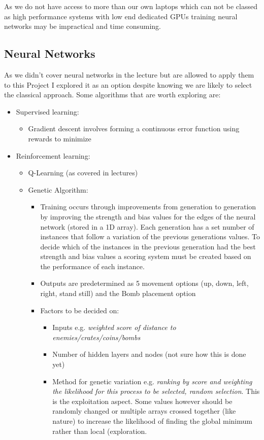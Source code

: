\documentclass[12pt]{report}
\begin{document}
As we do not have access to more than our own laptops which can not be classed as high performance systems with low end dedicated GPUs training neural networks may be impractical and time consuming.

\subsection{Neural Networks}
As we didn't cover neural networks in the lecture but are allowed to apply them to this Project I explored it as an option despite knowing we are likely to select the classical approach.
Some algorithms that are worth exploring are:
	\begin{itemize}
		\item Supervised learning:
		\begin{itemize}
			\item Gradient descent involves forming a continuous error function using rewards to minimize
		\end{itemize}
		\item Reinforcement learning:
		\begin{itemize}
			\item Q-Learning (as covered in lectures)
			\item Genetic Algorithm:
			\begin{itemize}
				\item Training occurs through improvements from generation to generation by improving the strength and bias values for the edges of the neural network (stored in a 1D array). Each generation has a set number of instances that follow a variation of the previous generations values. To decide which of the instances in the previous generation had the best strength and bias values a scoring system must be created based on the performance of each instance.
				\item Outputs are predetermined as 5 movement options (up, down, left, right, stand still) and the Bomb placement option
				\item Factors to be decided on:
				\begin{itemize}
					\item Inputs e.g. \textit{weighted score of distance to enemies/crates/coins/bombs}
					\item Number of hidden layers and nodes (not sure how this is done yet)
					\item Method for genetic variation e.g. \textit{ranking by score and weighting the likelihood for this process to be selected, random selection}. This is the exploitation aspect. Some values however should be randomly changed or multiple arrays crossed together (like nature) to increase the likelihood of finding the global minimum rather than local (exploration.
				\end{itemize}
			\end{itemize}
		\end{itemize}
	\end{itemize}		
\end{document}
